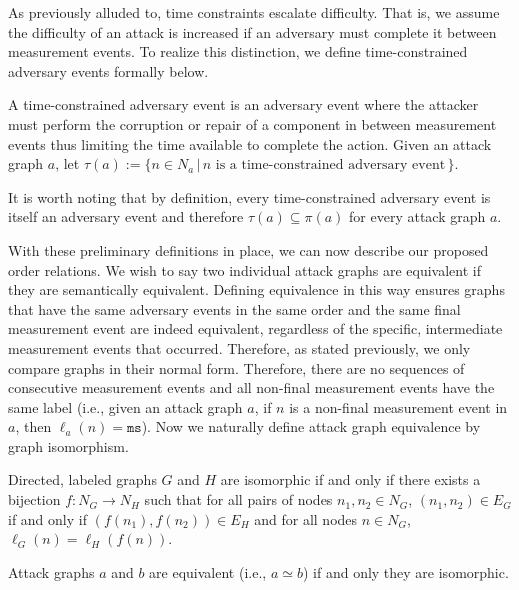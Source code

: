 \documentclass[runningheads]{llncs}
\theoremstyle{definition}
\begin{document}
As previously alluded to, time constraints escalate difficulty. That is, we assume the difficulty of an attack is increased if an adversary must complete it between measurement events. To realize this distinction, we define time-constrained adversary events formally below.  

\begin{definition}
    A time-constrained adversary event is an adversary event where the attacker must perform the corruption or repair of a component in between measurement events thus limiting the time available to complete the action. Given an attack graph $a$, let $\tau(a) := \{n \in N_a \,|\, n \text{ is a time-constrained adversary event}\,\}$.
\end{definition}

\noindent It is worth noting that by definition, every time-constrained adversary event is itself an adversary event and therefore $\tau(a) \subseteq \pi(a)$ for every attack graph $a$.


With these preliminary definitions in place, we can now describe our proposed order relations. We wish to say two individual attack graphs are equivalent if they are semantically equivalent. Defining equivalence in this way ensures graphs that have the same adversary events in the same order and the same final measurement event are indeed equivalent, regardless of the specific, intermediate measurement events that occurred. Therefore, as stated previously, we only compare graphs in their normal form. Therefore, there are no sequences of consecutive measurement events and all non-final measurement events have the same label (i.e., given an attack graph $a$, if $n$ is a non-final measurement event in $a$, then $\ell_a(n) = \texttt{ms}$). Now we naturally define attack graph equivalence by graph isomorphism.


\begin{definition}[Isomorphism]
    Directed, labeled graphs $G$ and $H$ are isomorphic if and only if there exists a bijection $f : N_G \to N_H$ such that for all pairs of nodes $n_1, n_2 \in N_G$, $(n_1,n_2) \in E_G$ if and only if $(f(n_1),f(n_2)) \in E_H$ and for all nodes $n \in N_G$, $\ell_G(n) = \ell_H(f(n))$.
\end{definition}


\begin{definition}
  Attack graphs $a$ and $b$ are equivalent (i.e., $a \simeq b$) if and only they are isomorphic.
\end{definition}
\end{document}
